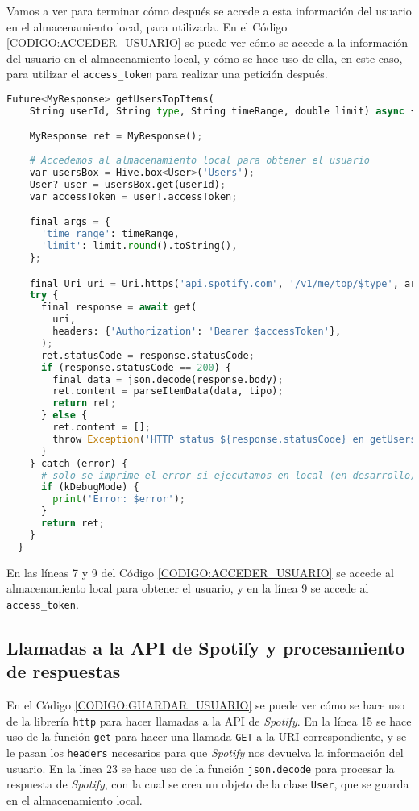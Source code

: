 Vamos a ver para terminar cómo después se accede a esta información del usuario en el almacenamiento local, para utilizarla.
En el Código \ref{CODIGO:ACCEDER_USUARIO} se puede ver cómo se accede a la información del usuario en el almacenamiento local, y 
cómo se hace uso de ella, en este caso, para utilizar el \texttt{access\_token} para realizar una petición después.

\begin{lstlisting}[language=python, caption=Acceder a la información del usuario, label=CODIGO:ACCEDER_USUARIO]
  Future<MyResponse> getUsersTopItems(
    String userId, String type, String timeRange, double limit) async {

    MyResponse ret = MyResponse();
    
    # Accedemos al almacenamiento local para obtener el usuario
    var usersBox = Hive.box<User>('Users');
    User? user = usersBox.get(userId);
    var accessToken = user!.accessToken;

    final args = {
      'time_range': timeRange,
      'limit': limit.round().toString(),
    };

    final Uri uri = Uri.https('api.spotify.com', '/v1/me/top/$type', args);
    try {
      final response = await get(
        uri,
        headers: {'Authorization': 'Bearer $accessToken'},
      );
      ret.statusCode = response.statusCode;
      if (response.statusCode == 200) {
        final data = json.decode(response.body);
        ret.content = parseItemData(data, tipo);
        return ret;
      } else {
        ret.content = [];
        throw Exception('HTTP status ${response.statusCode} en getUsersTopItems');
      }
    } catch (error) {
      # solo se imprime el error si ejecutamos en local (en desarrollo)
      if (kDebugMode) {
        print('Error: $error');
      }
      return ret;
    }
  }
\end{lstlisting}

En las líneas 7 y 9 del Código \ref{CODIGO:ACCEDER_USUARIO} se accede al almacenamiento local para obtener el usuario, y en la línea 9 
se accede al \texttt{access\_token}.

\subsection{Llamadas a la API de Spotify y procesamiento de respuestas\label{SEC:API_SPOTIFY_IMPLEMENTACION}}

En el Código \ref{CODIGO:GUARDAR_USUARIO} se puede ver cómo se hace uso de la librería \texttt{http} para hacer llamadas a la API de \textit{Spotify}.
En la línea 15 se hace uso de la función \texttt{get} para hacer una llamada \texttt{GET} a la URI correspondiente, y se le pasan
los \texttt{headers} necesarios para que \textit{Spotify} nos devuelva la información del usuario. En la línea 23 se hace uso de la función \texttt{json.decode}
para procesar la respuesta de \textit{Spotify}, con la cual se crea un objeto de la clase \texttt{User}, que se guarda en el almacenamiento local.

